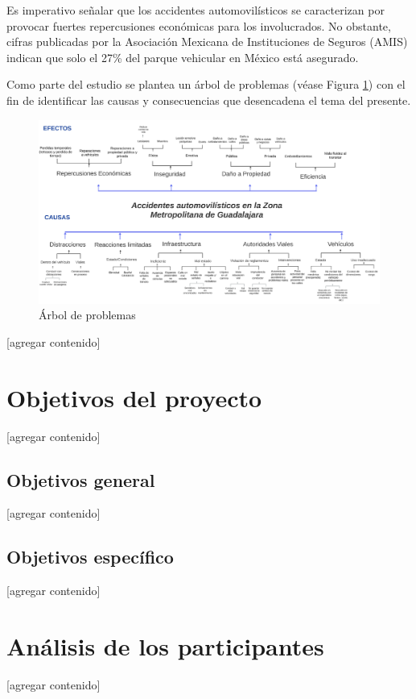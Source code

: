 \documentclass{article}
\begin{document}
Es imperativo señalar que los accidentes automovilísticos se caracterizan por provocar fuertes repercusiones económicas para los involucrados. No obstante, cifras publicadas por la Asociación Mexicana de Instituciones de Seguros (AMIS) indican que solo el 27\% del parque vehicular en México está asegurado.




Como parte del estudio se plantea un árbol de problemas (véase Figura \ref{fig:arbol}) con el fin de identificar las causas y consecuencias que desencadena el tema del presente. 


	\begin{figure}[H]\centering
	\includegraphics[width=1.25\textwidth]{resources/img/arbol_de_problemas.png}
	\caption{\label{fig:arbol} Árbol de problemas}
    \end{figure}

[agregar contenido]

\section{Objetivos del proyecto}\label{sec:objs}
[agregar contenido]

\subsection{Objetivos general}\label{subsec:general-objs}
[agregar contenido]

\subsection{Objetivos específico}\label{subsec:specific-objs}
[agregar contenido]

\section{Análisis de los participantes}\label{sec:participants}
[agregar contenido]
\end{document}
